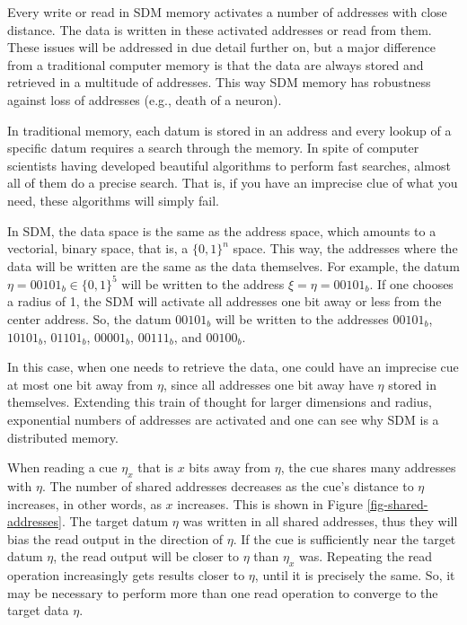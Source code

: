 Every write or read in SDM memory activates a number of addresses with close distance.  The data is written in these activated addresses or read from them.  These issues will be addressed in due detail further on, but a major difference from a traditional computer memory is that the data are always stored and retrieved in a multitude of addresses. This way SDM memory has robustness against loss of addresses (e.g., death of a neuron).

In traditional memory, each datum is stored in an address and every lookup of a specific datum requires a search through the memory. In spite of computer scientists having developed beautiful algorithms to perform fast searches, almost all of them do a precise search. That is, if you have an imprecise clue of what you need, these algorithms will simply fail.

In SDM, the data space is the same as the address space, which amounts to a vectorial, binary space, that is, a $\{0,1\}^{n}$ space. This way, the addresses where the data will be written are the same as the data themselves. For example, the datum $\eta=00101_{b}\in\{0,1\}^{5}$ will be written to the address $\xi=\eta=00101_{b}$. If one chooses a radius of 1, the SDM will activate all addresses one bit away or less from the center address. So, the datum $00101_{b}$ will be written to the addresses $00101_{b}$, $10101_{b}$, $01101_{b}$, $00001_{b}$, $00111_{b}$, and $00100_{b}$.

In this case, when one needs to retrieve the data, one could have an imprecise cue at most one bit away from $\eta$, since all addresses one bit away have $\eta$ stored in themselves.  Extending this train of thought for larger dimensions and radius, exponential numbers of addresses are activated and one can see why SDM is a distributed memory.

When reading a cue $\eta_{x}$ that is $x$ bits away from $\eta$, the cue shares many addresses with $\eta$. The number of shared addresses decreases as the cue's distance to $\eta$ increases, in other words, as $x$ increases. This is shown in Figure \ref{fig-shared-addresses}.  The target datum $\eta$ was written in all shared addresses, thus they will bias the read output in the direction of $\eta$. If the cue is sufficiently near the target datum $\eta$, the read output will be closer to $\eta$ than $\eta_{x}$ was. Repeating the read operation increasingly gets results closer to $\eta$, until it is precisely the same. So, it may be necessary to perform more than one read operation to converge to the target data $\eta$.

